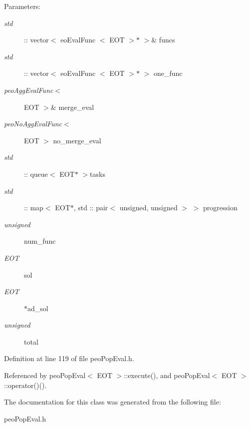 \begin{Desc}
\item[Parameters:]
\begin{description}
\item[{\em std}]:: vector$<$ eo\-Eval\-Func $<$ EOT $>$$\ast$ $>$\& funcs \item[{\em std}]:: vector$<$ eo\-Eval\-Func $<$ EOT $>$$\ast$ $>$ one\_\-func \item[{\em peo\-Agg\-Eval\-Func$<$}]EOT $>$\& merge\_\-eval \item[{\em peo\-No\-Agg\-Eval\-Func$<$}]EOT $>$ no\_\-merge\_\-eval \item[{\em std}]:: queue$<$ EOT$\ast$ $>$tasks \item[{\em std}]:: map$<$ EOT$\ast$, std :: pair$<$ unsigned, unsigned $>$ $>$ progression \item[{\em unsigned}]num\_\-func \item[{\em EOT}]sol \item[{\em EOT}]$\ast$ad\_\-sol \item[{\em unsigned}]total \end{description}
\end{Desc}


Definition at line 119 of file peo\-Pop\-Eval.h.

Referenced by peo\-Pop\-Eval$<$ EOT $>$::execute(), and peo\-Pop\-Eval$<$ EOT $>$::operator()().

The documentation for this class was generated from the following file:\begin{CompactItemize}
\item 
peo\-Pop\-Eval.h\end{CompactItemize}
